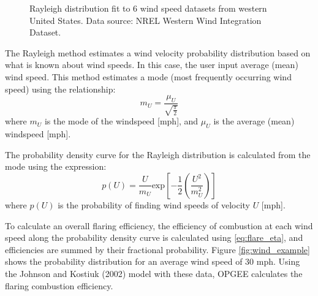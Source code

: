 \documentclass[11pt]{report}
\newcommand{\marg}[1]{{\footnotesize\textit{\textcolor{stanford}{'#1'}}}}
\newcommand{\marginnote}[1]{\marginpar{\marg{#1}}}
\begin{document}
\begin{figure}[tb]
\begin{center}
\hfill
{}
\caption{Rayleigh distribution fit to 6 wind speed datasets from western United States. Data source: NREL Western Wind Integration Dataset.}
\label{fig:wind_fits}
\end{center}
\end{figure}

The Rayleigh method estimates a wind velocity probability distribution based on what is known about wind speeds. In this case, the user input average (mean) wind speed. This method estimates a mode (most frequently occurring wind speed) using the relationship: 
\begin{equation}
m_U = \frac{\mu_U}{\sqrt{\frac{\pi}{2}}}
\end{equation}
where $m_U$ is the mode of the windspeed [mph], and $\mu_U$ is the average (mean) windspeed [mph].

The probability density curve for the Rayleigh distribution is calculated from the mode using the expression: 
\begin{equation}
p(U) = \frac{U}{m_{U}} \textrm{exp}\left[-\frac{1}{2}\left(\frac{U^2}{m_U^2}\right)\right]
\end{equation}
where $p(U)$ is the probability of finding wind speeds of velocity $U$ [mph].

To calculate an overall flaring efficiency, the efficiency of combustion at each wind speed along the probability density curve is calculated using \eqref{eq:flare_eta}, and efficiencies are summed by their fractional probability. Figure \ref{fig:wind_example} shows the probability distribution for an average wind speed of 30 mph.
Using the Johnson and Kostiuk (2002) model with these data, OPGEE calculates the flaring combustion efficiency. \marginnote{Flaring \\ 3.1}
\end{document}
